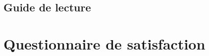 \documentclass[11pt, french, a4paper]{article}
\begin{document}
\subsection{Guide de lecture}





\section{Questionnaire de satisfaction}


\end{document}
